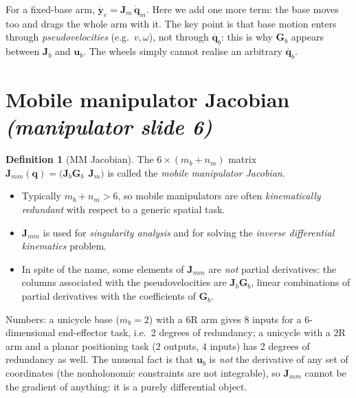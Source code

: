 \documentclass[11pt,a4paper]{article}
\newcommand{\qbase}{\bm{q}_b}
\newcommand{\ubase}{\bm{u}_b}
\newcommand{\Gbase}{\bm{G}_b}
\newcommand{\Jbase}{\bm{J}_b}
\newcommand{\Jarm}{\bm{J}_m}
\newcommand{\Jmm}{\bm{J}_{mm}}
\theoremstyle{plain}
\theoremstyle{definition}
\newtheorem{definition}[theorem]{Definition}
\theoremstyle{remark}
\begin{document}
\begin{intuition}
For a fixed-base arm, $\dot{\bm y}_e=\Jarm\,\dot{\bm q}_m$. Here we add one more term: the base moves too and drags the whole arm with it. The key point is that base motion enters through \emph{pseudovelocities} (e.g.\ $v,\omega$), not through $\dot{\qbase}$: this is why $\Gbase$ appears between $\Jbase$ and $\ubase$. The wheels simply cannot realise an arbitrary $\dot{\qbase}$.
\end{intuition}

\section{Mobile manipulator Jacobian \emph{(manipulator slide 6)}}

\begin{definition}[MM Jacobian]
The $6\times(m_b+n_m)$ matrix $\Jmm(\bm q)=\bigl(\Jbase\Gbase\ \ \Jarm\bigr)$ is called the \emph{mobile manipulator Jacobian}.
\end{definition}

\begin{itemize}[leftmargin=*]
\item Typically $m_b+n_m>6$, so mobile manipulators are often \emph{kinematically redundant} with respect to a generic spatial task.
\item $\Jmm$ is used for \emph{singularity analysis} and for solving the \emph{inverse differential kinematics} problem.
\item In spite of the name, some elements of $\Jmm$ are \emph{not} partial derivatives: the columns associated with the pseudovelocities are $\Jbase\Gbase$, linear combinations of partial derivatives with the coefficients of $\Gbase$.
\end{itemize}

\begin{intuition}
Numbers: a unicycle base ($m_b=2$) with a 6R arm gives 8 inputs for a 6-dimensional end-effector task, i.e.\ 2 degrees of redundancy; a unicycle with a 2R arm and a planar positioning task ($2$ outputs, $4$ inputs) has 2 degrees of redundancy as well. The unusual fact is that $\bm u_b$ is \emph{not} the derivative of any set of coordinates (the nonholonomic constraints are not integrable), so $\Jmm$ cannot be the gradient of anything: it is a purely differential object.
\end{intuition}

\end{document}
